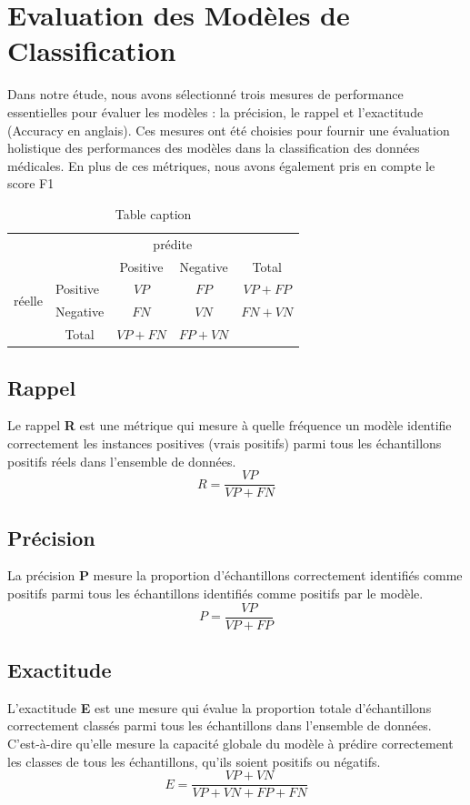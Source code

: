 \section{Evaluation des Modèles de Classification}
Dans notre étude, nous avons sélectionné trois mesures de performance essentielles pour évaluer les modèles : la précision, le rappel et l'exactitude (Accuracy en anglais). Ces mesures ont été choisies pour fournir une évaluation holistique des performances des modèles dans la classification des données médicales. En plus de ces métriques, nous avons également pris en compte le score F1
\begin{table}[htbp]
    \centering
    \begin{tabular}{l|l|c|c|c}
        \multicolumn{2}{c}{}&\multicolumn{2}{c}{prédite}&\\
        \cline{3-4}
        \multicolumn{2}{c|}{}&Positive&Negative&\multicolumn{1}{c}{Total}\\
        \cline{2-4}
        \multirow{2}{*}{réelle }& Positive & $VP$ & $FP$ & $VP+FP$\\
        \cline{2-4}
        & Negative & $FN$ & $VN$ & $FN+VN$\\
        \cline{2-4}
        \multicolumn{1}{c}{} & \multicolumn{1}{c}{Total} & \multicolumn{1}{c}{$VP+FN$} & \multicolumn{    1}{c}{$FP+VN$} \\
    \end{tabular}
    \caption{Table caption}
    \label{tab:mytable}
\end{table}

\subsection{Rappel}
Le rappel \textbf{R} est une métrique qui mesure à quelle fréquence un modèle identifie correctement les instances positives (vrais positifs) parmi tous les échantillons positifs réels dans l'ensemble de données.
\[ R = \frac{VP}{VP+FN} \]
\subsection{Précision}
La précision \textbf{P} mesure la proportion d'échantillons correctement identifiés comme positifs parmi tous les échantillons identifiés comme positifs par le modèle. 
\[ P = \frac{VP}{VP+FP} \]

\subsection{Exactitude}
L'exactitude \textbf{E} est une mesure qui évalue la proportion totale d'échantillons correctement classés parmi tous les échantillons dans l'ensemble de données. C'est-à-dire qu'elle mesure la capacité globale du modèle à prédire correctement les classes de tous les échantillons, qu'ils soient positifs ou négatifs.
\[ E = \frac{VP + VN}{VP + VN + FP + FN} \]

